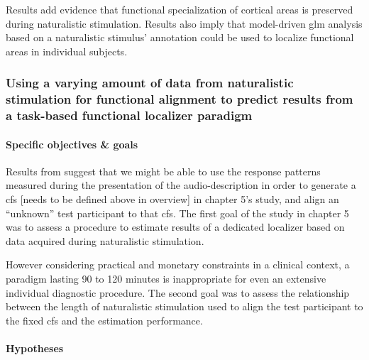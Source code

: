 Results add evidence \citep[cf.][]{bartels2004mapping} that functional
specialization of cortical areas is preserved during naturalistic stimulation.
%
Results also imply that model-driven \ac{glm} analysis based on a naturalistic
stimulus' annotation could be used to localize functional areas in individual
subjects.



\subsubsection{Using a varying amount of data from naturalistic stimulation for
functional alignment to predict results from a task-based functional localizer
paradigm}






\paragraph{Specific objectives \& goals}
%
Results from \citet{haeusler2022processing} suggest that we might be able
to use the response patterns measured during the presentation of the
audio-description in order to generate a \ac{cfs} [needs to be defined above in
overview] in chapter 5's study, and align an ``unknown'' test participant to
that \ac{cfs}.
%
The first goal of the study in chapter 5 was to assess a procedure to
estimate results of a dedicated localizer \citep{sengupta2016extension} based on
data acquired during naturalistic stimulation.

%
However considering practical and monetary constraints in a clinical context, a
paradigm lasting 90 to 120 minutes is inappropriate for even an extensive
individual diagnostic procedure.
The second goal was to assess the relationship between the length of
naturalistic stimulation used to align the test participant to the fixed
\ac{cfs} and the estimation performance.


\paragraph{Hypotheses}

